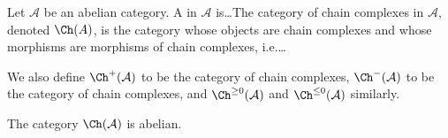 \documentclass[main.tex]{subfiles}
\begin{document}
\begin{definition}
  \label{def:category_of_chain_complexes_abelian}
  Let $\mathcal{A}$ be an abelian category. A  in $\mathcal{A}$ is\dots The category of chain complexes in $\mathcal{A}$, denoted $\Ch(A)$, is the category whose objects are chain complexes and whose morphisms are morphisms of chain complexes, i.e.\dots

  We also define $\Ch^{+}(\mathcal{A})$ to be the category of  chain complexes, $\Ch^{-}(\mathcal{A})$ to be the category of  chain complexes, and $\Ch^{\geq 0}(\mathcal{A})$ and $\Ch^{\leq 0}(\mathcal{A})$ similarly.
\end{definition}

\begin{proposition}
  The category $\Ch(\mathcal{A})$ is abelian.
\end{proposition}
\end{document}
